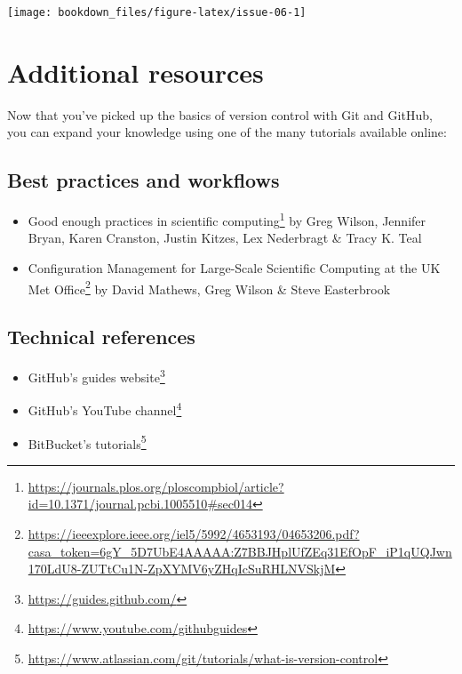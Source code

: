 \documentclass[
]{krantz}
\providecommand{\tightlist}{%
  \setlength{\itemsep}{0pt}\setlength{\parskip}{0pt}}
\renewcommand{\href}[2]{#2\footnote{\url{#1}}}
\begin{document}
\texttt{[image: bookdown\_files/figure-latex/issue-06-1]}

\hypertarget{additional-resources-2}{%
\section{Additional resources}\label{additional-resources-2}}

Now that you've picked up the basics of version control with Git and GitHub, you can expand your knowledge using
one of the many tutorials available online:

\hypertarget{best-practices-and-workflows}{%
\subsection{Best practices and workflows}\label{best-practices-and-workflows}}

\begin{itemize}
\tightlist
\item
  \href{https://journals.plos.org/ploscompbiol/article?id=10.1371/journal.pcbi.1005510\#sec014}{Good enough practices in scientific computing} \citeyearpar{wilson2014best} by Greg Wilson, Jennifer Bryan, Karen Cranston, Justin Kitzes, Lex Nederbragt \& Tracy K. Teal
\item
  \href{https://ieeexplore.ieee.org/iel5/5992/4653193/04653206.pdf?casa_token=6gY_5D7UbE4AAAAA:Z7BBJHplUfZEq31EfOpF_iP1qUQJwn170LdU8-ZUTtCu1N-ZpXYMV6yZHqIcSuRHLNVSkjM}{Configuration Management for Large-Scale Scientific Computing at the UK Met Office} \citeyearpar{matthews2008configuration} by David Mathews, Greg Wilson \& Steve Easterbrook
\end{itemize}

\hypertarget{technical-references}{%
\subsection{Technical references}\label{technical-references}}

\begin{itemize}
\tightlist
\item
  GitHub's \href{https://guides.github.com/}{guides website}
\item
  GitHub's \href{https://www.youtube.com/githubguides}{YouTube channel}
\item
  BitBucket's \href{https://www.atlassian.com/git/tutorials/what-is-version-control}{tutorials}
\end{itemize}
\end{document}

